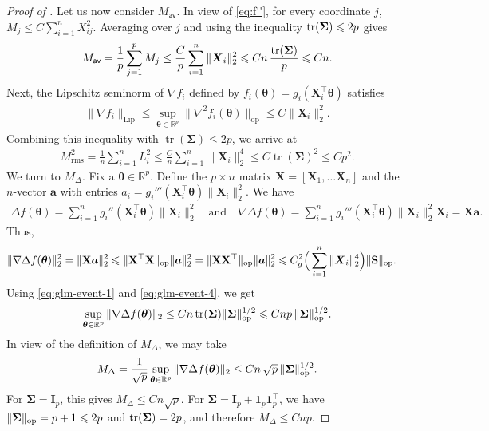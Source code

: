 \documentclass[aos,reqno]{imsart}
\newcommand\bfS{\mathbf S}
\newcommand\bX{\boldsymbol X}
\newcommand\bfX{\mathbf X}
\DeclareMathOperator{\tr}{tr}
\newcommand\btheta{\boldsymbol\theta}
\newcommand\bSigma{\boldsymbol\Sigma}
\def\Mav{M_{\textsf{av}}}
\def\Mtwo{M_{\mathrm{rms}}}
\theoremstyle{definition}
\begin{document}
\begin{proof}[Proof of ]
Let us now consider $\Mav$. In view of \eqref{eq:f''}, 
for every coordinate $j$, $ M_j\leqslant  C\sum_{i=1}^n 
X_{ij}^2$.  Averaging over $j$ and using the inequality 
${\rm tr}(\bSigma)\leqslant 2p$ gives
\begin{align}
    \Mav = \frac1p\sum_{j=1}^p M_j \leq
    \frac{C}{p}\sum_{i=1}^n\|\bX_i\|_2^2
    \leqslant Cn\,\frac{{\rm tr}(\bSigma)}{p}
    \leqslant Cn.    
    \label{eq:glm-Mav}
\end{align}
Next, the Lipschitz seminorm of $\nabla f_i$ 
defined by $f_i(\btheta)=g_i(\bX_i^\top\btheta)$ 
satisfies
\begin{align}
    \|\nabla f_i\|_{\textrm{Lip}}\leqslant 
    \sup_{\btheta\in\mathbb R^p}\|\nabla^2 f_i
    (\btheta)\|_{\textrm{op}} \leqslant  C\|
    \bX_i\|_2^2 .
\end{align}
Combining this inequality with $\tr(\bSigma)
\leqslant 2p$, we arrive at
\begin{align}
    \Mtwo^2 = \frac1n\sum_{i=1}^n L_i^2
    \leq \frac{C}{n}\sum_{i=1}^n\|\bX_i\|_2^4 
    \leq C \tr(\bSigma)^2\leqslant Cp^2.
    \label{eq:glm-Mtwo}
\end{align}
We turn to $M_\Delta$. Fix a $\btheta\in\mathbb R^p$. 
Define the $p\times n$ matrix $\bfX = [\bX_1,\ldots 
\bX_n]$ and the $n$-vector $\boldsymbol{a}$ with entries 
$a_i = g_i'''(\bX_i^\top\btheta)\|\bX_i\|_2^2$. 
We have 
\begin{align}
    \Delta f(\btheta) = \sum_{i=1}^n g_i''(\bX_i^\top
    \btheta)\|\bX_i\|_2^2 \quad\text{and}\quad
    \nabla\Delta f(\btheta) = \sum_{i=1}^n g_i'''
    (\bX_i^\top\btheta)\|\bX_i\|_2^2\bX_i = 
    \bfX\boldsymbol{a}.
\end{align}
Thus,
\begin{align}
    \|\nabla\Delta f(\btheta)\|_2^2
    & = \|\bfX\boldsymbol{a}\|_2^2\leqslant \|\bfX^\top
    \bfX\|_{\text{op}}\|\boldsymbol{a}\|_2^2 = \|\bfX
    \bfX^\top\|_{\text{op}}\|\boldsymbol{a}\|_2^2
    \leqslant C_g^2\Big(\sum_{i=1}^n\|\bX_i\|_2^4\Big)
    \|\bfS\|_{\rm op}.
\end{align}
Using \eqref{eq:glm-event-1} and \eqref{eq:glm-event-4},
we get
\begin{align}
    \sup_{\btheta\in\mathbb R^p}
    \|\nabla\Delta f(\btheta)\|_2 \leq Cn\,{\rm tr}
    (\bSigma)\|\bSigma\|_{\rm op}^{1/2} \leqslant
    Cnp\,\|\bSigma\|_{\rm op}^{1/2}.
\end{align}
In view of the definition of $M_\Delta$, 
we may take
\begin{align}
    M_\Delta = \frac1{\sqrt{p}} \sup_{\btheta\in
    \mathbb R^p} \|\nabla\Delta f(\btheta)\|_2
    \leq
    Cn\,{\sqrt p}\,
    \|\bSigma\|_{\rm op}^{1/2}.
    \label{eq:glm-Mdelta}
\end{align}
For $\bSigma=\mathbf I_p$, this gives
$M_\Delta\leqslant Cn\sqrt p$. For
$\bSigma=\mathbf I_p+\mathbf 1_p\mathbf 1_p^\top$,
we have $\|\bSigma\|_{\rm op}=p+1\leqslant 2p$ and
${\rm tr}(\bSigma)=2p$, and therefore
$M_\Delta\leqslant Cnp$.


\end{proof}
\end{document}
